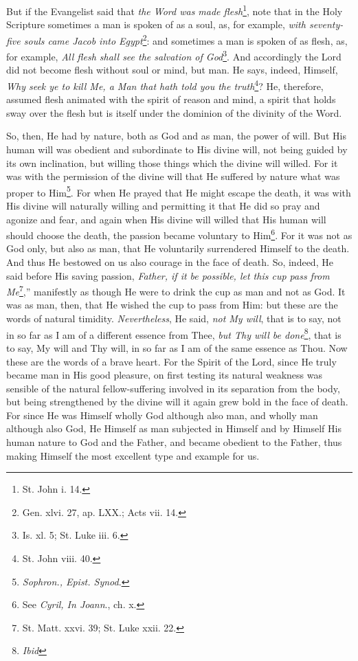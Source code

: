 But if the Evangelist said that \emph{the Word was made flesh}\footnote{St. John i. 14.}, note that in the Holy Scripture sometimes a man is spoken of as a soul, as, for example, \emph{with seventy-five souls came Jacob into Egypt}\footnote{Gen. xlvi. 27, ap. LXX.; Acts vii. 14.}: and sometimes a man is spoken of as flesh, as, for example, \emph{All flesh shall see the salvation of God}\footnote{Is. xl. 5; St. Luke iii. 6.}. And accordingly the Lord did not become flesh without soul or mind, but man. He says, indeed, Himself, \emph{Why seek ye to kill Me, a Man that hath told you the truth}\footnote{St. John viii. 40.}? He, therefore, assumed flesh animated with the spirit of reason and mind, a spirit that holds sway over the flesh but is itself under the dominion of the divinity of the Word.

So, then, He had by nature, both as God and as man, the power of will. But His human will was obedient and subordinate to His divine will, not being guided by its own inclination, but willing those things which the divine will willed. For it was with the permission of the divine will that He suffered by nature what was proper to Him\footnote{\emph{Sophron., Epist. Synod}.}. For when He prayed that He might escape the death, it was with His divine will naturally willing and permitting it that He did so pray and agonize and fear, and again when His divine will willed that His human will should choose the death, the passion became voluntary to Him\footnote{See \emph{Cyril, In Joann}., ch. x.}. For it was not as God only, but also as man, that He voluntarily surrendered Himself to the death. And thus He bestowed on us also courage in the face of death. So, indeed, He said before His saving passion, \emph{Father, if it be possible, let this cup pass from Me}\footnote{St. Matt. xxvi. 39; St. Luke xxii. 22.},” manifestly as though He were to drink the cup as man and not as God. It was as man, then, that He wished the cup to pass from Him: but these are the words of natural timidity. \emph{Nevertheless}, He said, \emph{not My will}, that is to say, not in so far as I am of a different essence from Thee, \emph{but Thy will be done}\footnote{\emph{Ibid}}, that is to say, My will and Thy will, in so far as I am of the same essence as Thou. Now these are the words of a brave heart. For the Spirit of the Lord, since He truly became man in His good pleasure, on first testing its natural weakness was sensible of the natural fellow-suffering involved in its separation from the body, but being strengthened by the divine will it again grew bold in the face of death. For since He was Himself wholly God although also man, and wholly man although also God, He Himself as man subjected in Himself and by Himself His human nature to God and the Father, and became obedient to the Father, thus making Himself the most excellent type and example for us.

